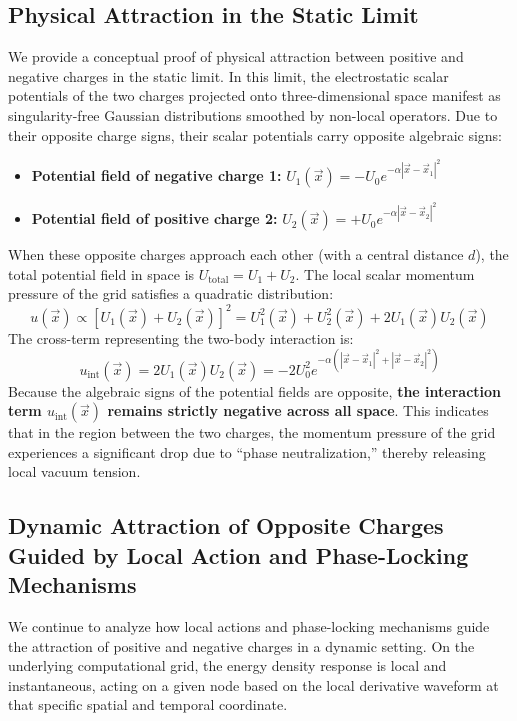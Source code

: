 \documentclass[12pt, a4paper]{article}
\begin{document}
\subsection{Physical Attraction in the Static Limit}

We provide a conceptual proof of physical attraction between positive and negative charges in the static limit. In this limit, the electrostatic scalar potentials of the two charges projected onto three-dimensional space manifest as singularity-free Gaussian distributions smoothed by non-local operators. Due to their opposite charge signs, their scalar potentials carry opposite algebraic signs:
\begin{itemize}
    \item \textbf{Potential field of negative charge 1:} $U_1(\vec{x}) = - U_0 e^{-\alpha |\vec{x} - \vec{x}_1|^2}$
    \item \textbf{Potential field of positive charge 2:} $U_2(\vec{x}) = + U_0 e^{-\alpha |\vec{x} - \vec{x}_2|^2}$
\end{itemize}
When these opposite charges approach each other (with a central distance $d$), the total potential field in space is $U_{\mathrm{total}} = U_1 + U_2$. The local scalar momentum pressure of the grid satisfies a quadratic distribution:
\begin{equation}
u(\vec{x}) \propto [U_1(\vec{x}) + U_2(\vec{x})]^2 = U_1^2(\vec{x}) + U_2^2(\vec{x}) + 2 U_1(\vec{x})U_2(\vec{x})
\end{equation}
The cross-term representing the two-body interaction is:
\begin{equation}
u_{\mathrm{int}}(\vec{x}) = 2 U_1(\vec{x})U_2(\vec{x}) = - 2 U_0^2 e^{-\alpha \left( |\vec{x} - \vec{x}_1|^2 + |\vec{x} - \vec{x}_2|^2 \right)}
\end{equation}
Because the algebraic signs of the potential fields are opposite, \textbf{the interaction term $u_{\mathrm{int}}(\vec{x})$ remains strictly negative across all space}. This indicates that in the region between the two charges, the momentum pressure of the grid experiences a significant drop due to ``phase neutralization,'' thereby releasing local vacuum tension.

\subsection{Dynamic Attraction of Opposite Charges Guided by Local Action and Phase-Locking Mechanisms}

We continue to analyze how local actions and phase-locking mechanisms guide the attraction of positive and negative charges in a dynamic setting. On the underlying computational grid, the energy density response is local and instantaneous, acting on a given node based on the local derivative waveform at that specific spatial and temporal coordinate.
\end{document}
